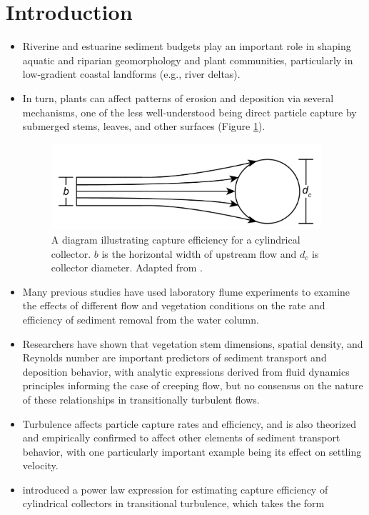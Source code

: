 \documentclass{article}
\begin{document}
\section{Introduction}

\begin{itemize}
    \item Riverine and estuarine sediment budgets play an important role in shaping aquatic and riparian geomorphology and plant communities, particularly in low-gradient coastal landforms (e.g., river deltas).
    \item In turn, plants can affect patterns of erosion and deposition via several mechanisms, one of the less well-understood being direct particle capture by submerged stems, leaves, and other surfaces (Figure \ref{fig:capeff}). 
    \begin{figure}[htbp]
\includegraphics[width=10cm]{collectorefficiency.png}
\centering
\caption{A diagram illustrating capture efficiency for a cylindrical collector. $b$ is the horizontal width of upstream flow and $d_c$ is collector diameter. Adapted from \cite{Palmer_2004}.}
\label{fig:capeff}
\end{figure}
    \item Many previous studies have used laboratory flume experiments to examine the effects of different flow and vegetation conditions on the rate and efficiency of sediment removal from the water column.
    \item Researchers have shown that vegetation stem dimensions, spatial density, and Reynolds number are important predictors of sediment transport and deposition behavior, with analytic expressions derived from fluid dynamics principles informing the case of creeping flow, but no consensus on the nature of these relationships in transitionally turbulent flows. 
    \item Turbulence affects particle capture rates and efficiency, and is also theorized and empirically confirmed to affect other elements of sediment transport behavior, with one particularly important example being its effect on settling velocity.
    \item \cite{Palmer_2004} introduced a power law expression for estimating capture efficiency of cylindrical collectors in transitional turbulence, which takes the form 

\end{itemize}
\end{document}
